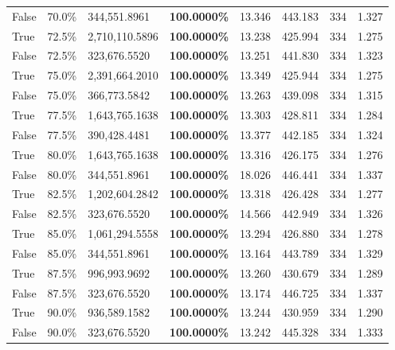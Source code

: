 \begin{table}[H]
\begin{tabular}{lllrllll}
\cline{1-8}
False & 70.0\% & 344,551.8961 & \bfseries \color{red} 100.0000\% & 13.346 & 443.183 & 334 & 1.327 \\
\cline{1-8}
True & 72.5\% & 2,710,110.5896 & \bfseries \color{red} 100.0000\% & 13.238 & 425.994 & 334 & 1.275 \\
\cline{1-8}
False & 72.5\% & 323,676.5520 & \bfseries \color{red} 100.0000\% & 13.251 & 441.830 & 334 & 1.323 \\
\cline{1-8}
True & 75.0\% & 2,391,664.2010 & \bfseries \color{red} 100.0000\% & 13.349 & 425.944 & 334 & 1.275 \\
\cline{1-8}
False & 75.0\% & 366,773.5842 & \bfseries \color{red} 100.0000\% & 13.263 & 439.098 & 334 & 1.315 \\
\cline{1-8}
True & 77.5\% & 1,643,765.1638 & \bfseries \color{red} 100.0000\% & 13.303 & 428.811 & 334 & 1.284 \\
\cline{1-8}
False & 77.5\% & 390,428.4481 & \bfseries \color{red} 100.0000\% & 13.377 & 442.185 & 334 & 1.324 \\
\cline{1-8}
True & 80.0\% & 1,643,765.1638 & \bfseries \color{red} 100.0000\% & 13.316 & 426.175 & 334 & 1.276 \\
\cline{1-8}
False & 80.0\% & 344,551.8961 & \bfseries \color{red} 100.0000\% & 18.026 & 446.441 & 334 & 1.337 \\
\cline{1-8}
True & 82.5\% & 1,202,604.2842 & \bfseries \color{red} 100.0000\% & 13.318 & 426.428 & 334 & 1.277 \\
\cline{1-8}
False & 82.5\% & 323,676.5520 & \bfseries \color{red} 100.0000\% & 14.566 & 442.949 & 334 & 1.326 \\
\cline{1-8}
True & 85.0\% & 1,061,294.5558 & \bfseries \color{red} 100.0000\% & 13.294 & 426.880 & 334 & 1.278 \\
\cline{1-8}
False & 85.0\% & 344,551.8961 & \bfseries \color{red} 100.0000\% & 13.164 & 443.789 & 334 & 1.329 \\
\cline{1-8}
True & 87.5\% & 996,993.9692 & \bfseries \color{red} 100.0000\% & 13.260 & 430.679 & 334 & 1.289 \\
\cline{1-8}
False & 87.5\% & 323,676.5520 & \bfseries \color{red} 100.0000\% & 13.174 & 446.725 & 334 & 1.337 \\
\cline{1-8}
True & 90.0\% & 936,589.1582 & \bfseries \color{red} 100.0000\% & 13.244 & 430.959 & 334 & 1.290 \\
\cline{1-8}
False & 90.0\% & 323,676.5520 & \bfseries \color{red} 100.0000\% & 13.242 & 445.328 & 334 & 1.333 \\

\end{tabular}
\end{table}
